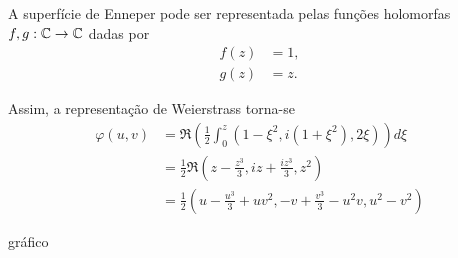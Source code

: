 \begin{exemplo}
	A superfície de Enneper pode ser representada pelas funções holomorfas $f,g: \mathbb{C} \rightarrow \mathbb{C}$ dadas por
	\begin{align*}
	f(z) &= 1, \\
	g(z) &= z.
	\end{align*}
	
	Assim, a representação de Weierstrass torna-se
	\begin{align*}
	\varphi(u,v) &= \Re \left( \frac{1}{2} \int_{0}^{z} \left( 1 - \xi^2, i (1 + \xi^2), 2\xi \right) \right) d\xi \\
	&= \frac{1}{2} \Re \left( z - \frac{z^3}{3}, iz + \frac{iz^3}{3}, z^2 \right) \\
	&= \frac{1}{2} \left( u - \frac{u^3}{3} + uv^2, -v + \frac{v^3}{3} - u^2v, u^2 - v^2 \right)
	\end{align*}
	
	gráfico
\end{exemplo}

